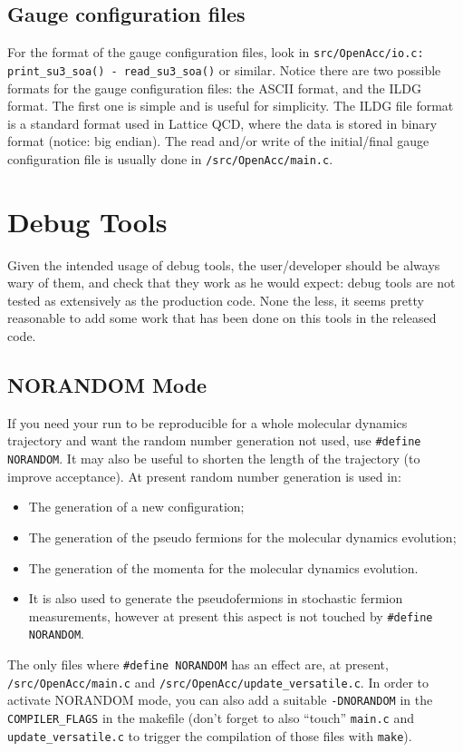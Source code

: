 \subsection{Gauge configuration files}
For the format of the gauge configuration files, look in 
\verb|src/OpenAcc/io.c: print_su3_soa() - read_su3_soa()| or similar.
Notice there are two possible formats for the gauge configuration files: the 
ASCII format, and the ILDG format. The first one is simple and is useful for 
simplicity. The ILDG file format is a standard format used in Lattice QCD, 
where the data is stored in binary format (notice: big endian).  
The read and/or write of the initial/final gauge configuration file
is usually done in \verb|/src/OpenAcc/main.c|.


\section{Debug Tools}
Given the intended usage of debug tools, the user/developer should be always 
wary of them, and check that they work as he would expect: debug tools are not 
tested as extensively as the production code. None the less, it seems pretty
reasonable to add some work that has been done on this tools in the released 
code.
\subsection{ NORANDOM Mode}
If you need your run to be reproducible for a whole molecular dynamics 
trajectory and want the random number generation not used, use 
\verb|#define NORANDOM|. It may also be useful to shorten the length of the 
trajectory (to improve acceptance).
At present random number generation is used in:
\begin{itemize}
    \item The generation of a new configuration;
    \item The generation of the pseudo fermions for the molecular dynamics 
        evolution;
    \item The generation of the momenta for the molecular dynamics evolution.
    \item It is also used to generate the pseudofermions in stochastic fermion 
        measurements, however at present this aspect is not touched by 
        \verb|#define NORANDOM|.
\end{itemize}
The only files where \verb|#define NORANDOM| has an effect are, at present, 
\verb|/src/OpenAcc/main.c| and \verb|/src/OpenAcc/update_versatile.c|. In order 
to activate NORANDOM mode, you can also add a suitable \verb|-DNORANDOM| in the 
\verb|COMPILER_FLAGS| in the makefile (don't forget to also ``touch'' 
\verb|main.c| and \verb|update_versatile.c| to trigger the compilation of those 
files with \verb|make|).



